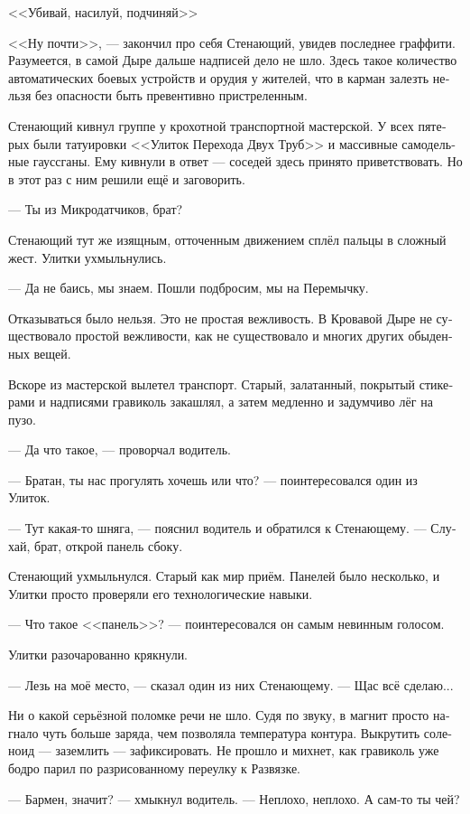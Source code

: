 \documentclass[a4paper,12pt,fleqn]{book}\usepackage{cooltooltips}\usepackage{polyglossia}\setdefaultlanguage[babelshorthands=true]{russian}\setotherlanguage{english}\defaultfontfeatures{Ligatures=TeX,Mapping=tex-text} \usepackage{xcolor}\definecolor{lightgray}{HTML}{bbbbbb}\color{lightgray}\newcommand{\ml}[3]{\textenglish{\textcolor{black}{#3}}}
\newcommand{\asterism}{\vspace{1em}{\centering\Large\bfseries$\ast~\ast~\ast$\par}\vspace{1em}}
\begin{document}
<<Убивай, насилуй, подчиняй>>

<<Ну почти>>, --- закончил про себя Стенающий, увидев последнее граффити.
Разумеется, в самой Дыре дальше надписей дело не шло.
Здесь такое количество автоматических боевых устройств и орудия у жителей, что в карман залезть нельзя без опасности быть превентивно пристреленным.

Стенающий кивнул группе у крохотной транспортной мастерской.
У всех пятерых были татуировки <<Улиток Перехода Двух Труб>> и массивные самодельные гауссганы.
Ему кивнули в ответ --- соседей здесь принято приветствовать.
Но в этот раз с ним решили ещё и заговорить.

--- Ты из Микродатчиков, брат?

Стенающий тут же изящным, отточенным движением сплёл пальцы в сложный жест.
Улитки ухмыльнулись.

--- Да не баись, мы знаем.
Пошли подбросим, мы на Перемычку.

Отказываться было нельзя.
Это не простая вежливость.
В Кровавой Дыре не существовало простой вежливости, как не существовало и многих других обыденных вещей.

Вскоре из мастерской вылетел транспорт.
Старый, залатанный, покрытый стикерами и надписями гравиколь закашлял, а затем медленно и задумчиво лёг на пузо.

--- Да что такое, --- проворчал водитель.

--- Братан, ты нас прогулять хочешь или что? --- поинтересовался один из Улиток.

--- Тут какая-то шняга, --- пояснил водитель и обратился к Стенающему.
--- Слухай, брат, открой панель сбоку.

Стенающий ухмыльнулся.
Старый как мир приём.
Панелей было несколько, и Улитки просто проверяли его технологические навыки.

--- Что такое <<панель>>? --- поинтересовался он самым невинным голосом.

Улитки разочарованно крякнули.

--- Лезь на моё место, --- сказал один из них Стенающему.
--- Щас всё сделаю...

Ни о какой серьёзной поломке речи не шло.
Судя по звуку, в магнит просто нагнало чуть больше заряда, чем позволяла температура контура.
Выкрутить соленоид --- заземлить --- зафиксировать.
Не прошло и михнет, как гравиколь уже бодро парил по разрисованному переулку к Развязке.

\asterism

--- Бармен, значит? --- хмыкнул водитель.
--- Неплохо, неплохо.
А сам-то ты чей?
\end{document}
